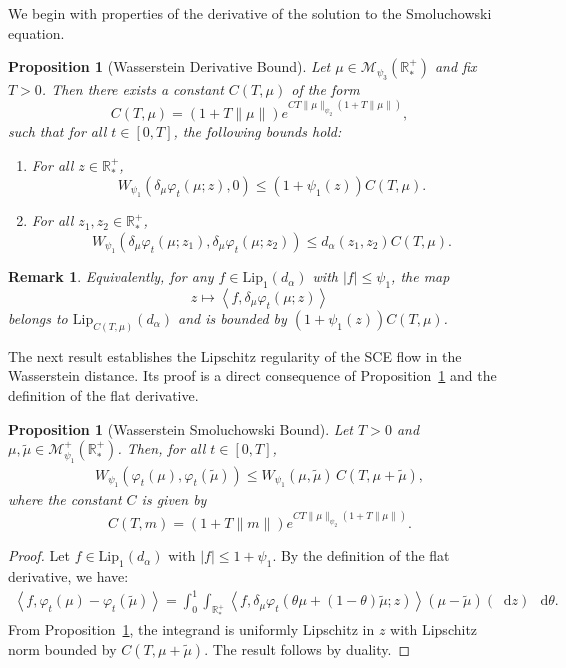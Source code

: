 \documentclass[11pt,a4paper]{article}
\newcommand{\RRP}{\mathbb{R}^+_*}
\newcommand{\MC}{\mathcal{M}}
\newcommand{\brac}[1]{\left\langle#1\right\rangle}
\newcommand{\dd}{\mathop{}\!\mathrm{d}}
\newtheorem{remark}[theorem]{Remark}
\newtheorem{proposition}[theorem]{Proposition}
\begin{document}
We begin with properties of the derivative of the solution to the Smoluchowski equation.

\begin{proposition}[Wasserstein Derivative Bound]\label{prop:wass-derivative}
    Let $\mu \in \MC_{\psi_3}(\RRP)$ and fix $T > 0$. Then there exists a constant $C(T,\mu)$ of the form
    \[
    C(T,\mu) = (1 + T\|\mu\|) e^{CT\|\mu\|_{\psi_2}\left(1 + T\|\mu\|\right)},
    \]
    such that for all $t \in [0, T]$, the following bounds hold:
    \begin{enumerate}
        \item For all $z \in \RRP$,
        \[
        W_{\psi_1}\left( \delta_\mu \varphi_t(\mu; z), 0 \right) \leq (1 + \psi_1(z)) C(T,\mu).
        \]
        \item For all $z_1, z_2 \in \RRP$,
        \[
        W_{\psi_1}\left( \delta_\mu \varphi_t(\mu; z_1), \delta_\mu \varphi_t(\mu; z_2) \right) \leq d_\alpha(z_1, z_2) C(T,\mu).
        \]
    \end{enumerate}
\end{proposition}

\begin{remark}
    Equivalently, for any $f \in \mathrm{Lip}_1(d_\alpha)$ with $|f| \leq \psi_1$, the map
    \[
    z \mapsto \brac{f, \delta_\mu \varphi_t(\mu; z)}
    \]
    belongs to $\mathrm{Lip}_{C(T,\mu)}(d_\alpha)$ and is bounded by $(1 + \psi_1(z)) C(T,\mu)$.
\end{remark}

The next result establishes the Lipschitz regularity of the SCE flow in the Wasserstein distance. Its proof is a direct consequence of Proposition~\ref{prop:wass-derivative} and the definition of the flat derivative.

\begin{proposition}[Wasserstein Smoluchowski Bound]\label{prop:wass-sce}
    Let $T > 0$ and $\mu, \tilde{\mu} \in \MC^+_{\psi_1}(\RRP)$. Then, for all $t \in [0,T]$,
    \begin{align*}
        W_{\psi_1} (\varphi_t(\mu),\varphi_t(\tilde{\mu})) \leq W_{\psi_1} (\mu,\tilde{\mu})\, C(T,\mu + \tilde{\mu}),
    \end{align*}
    where the constant $C$ is given by
    \[
        C(T,m) = (1 + T\|m\|)e^{CT\|\mu\|_{\psi_2}\left(1 + T\|\mu\|\right)}.
    \]
\end{proposition}

\begin{proof}
    Let $f \in \mathrm{Lip}_1(d_\alpha)$ with $|f| \leq 1 + \psi_1$. By the definition of the flat derivative, we have:
    \begin{align*}
        \brac{f,\varphi_t(\mu)-\varphi_t(\tilde{\mu})} = \int_0^1 \int_{\RRP} \brac{f, \delta_\mu\varphi_t(\theta\mu + (1-\theta)\tilde{\mu};z)} \left(\mu-\tilde{\mu}\right)(\dd z)\, \dd \theta.
    \end{align*}
    From Proposition~\ref{prop:wass-derivative}, the integrand is uniformly Lipschitz in $z$ with Lipschitz norm bounded by $C(T,\mu + \tilde{\mu})$. The result follows by duality.
\end{proof}
\end{document}
